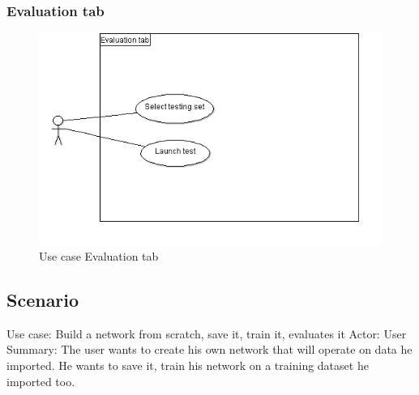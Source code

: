 \pagebreak
    
    \subsubsection{Evaluation tab}
    \begin{figure}[htbp]
        \centering 
        \includegraphics[width=\textwidth]{figures/dcuEvaluation.png}
        \caption{Use case Evaluation tab}
    \end{figure}
    
\subsection{Scenario}
    Use case: Build a network from scratch, save it, train it, evaluates it
    Actor: User
    Summary: The user wants to create his own network that will operate on data he imported. He wants to save it, train his network on a training dataset he imported too.
    \newline
    
